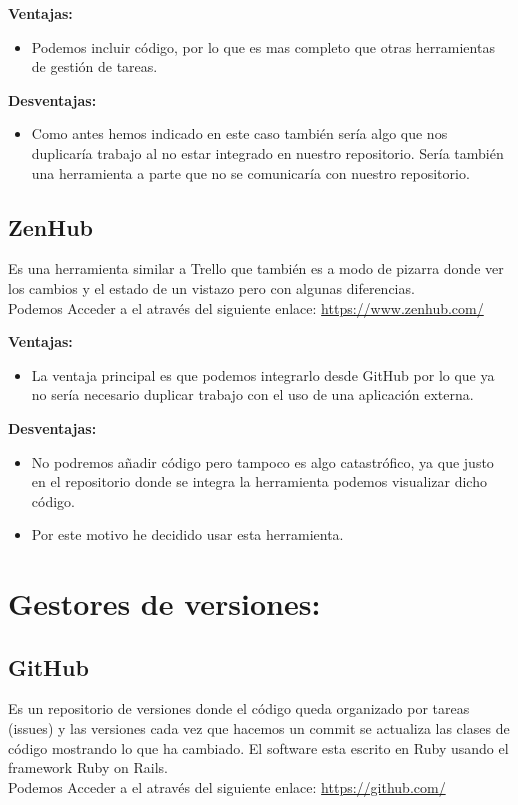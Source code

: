 \textbf{Ventajas:}

\begin{itemize}
\item Podemos incluir código, por lo que es mas completo que otras herramientas de gestión de tareas.
\end{itemize}

\textbf{Desventajas:}

\begin{itemize}
\item Como antes hemos indicado en este caso también sería algo que nos duplicaría trabajo al no estar integrado en nuestro repositorio. Sería también una herramienta a parte que no se comunicaría con nuestro repositorio.
\end{itemize}


\subsection{ZenHub}
Es una herramienta similar a Trello que también es a modo de pizarra donde ver los cambios y el estado de un vistazo pero con algunas diferencias.\\
Podemos Acceder a el através del siguiente enlace: 
\url{https://www.zenhub.com/}



\textbf{Ventajas:}

\begin{itemize}
\item La ventaja principal es que podemos integrarlo desde GitHub por lo que ya no sería necesario duplicar trabajo con el uso de una aplicación externa.
\end{itemize}

\textbf{Desventajas:}

\begin{itemize}
\item No podremos añadir código pero tampoco es algo catastrófico, ya que justo en el repositorio donde se integra la herramienta podemos visualizar dicho código.

\item Por este motivo he decidido usar esta herramienta.
\end{itemize}

\section{Gestores de versiones:}
\subsection{GitHub}
Es un repositorio de versiones donde el código queda organizado por tareas (issues) y las versiones cada vez que hacemos un commit se actualiza las clases de código mostrando lo que ha cambiado.
El software esta escrito en Ruby usando el framework Ruby on Rails.\\
Podemos Acceder a el através del siguiente enlace: 
\url{https://github.com/}



